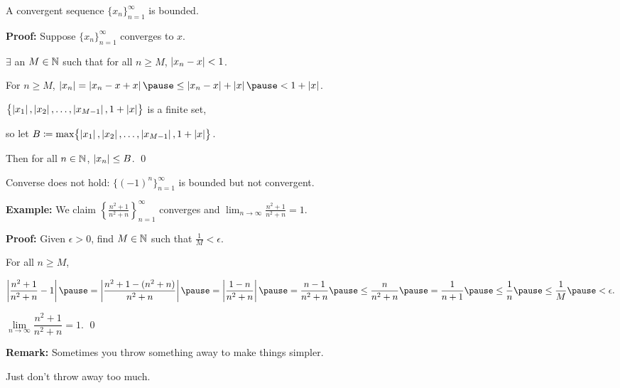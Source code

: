 \documentclass[10pt,aspectratio=169]{beamer}
\begin{document}
\begin{frame}

\begin{proposition}
A convergent sequence $\{ x_n \}_{n=1}^\infty$ is bounded.
\end{proposition}

\pause

\textbf{Proof:}
Suppose $\{ x_n \}_{n=1}^\infty$ converges to $x$.

\pause
\thus \quad $\exists$ an $M \in {\mathbb{N}}$ such that for all $n \geq M$,\quad
$\left\lvert {x_n - x} \right\rvert < 1$.

\medskip
\pause

For $n \geq M$, \quad
$\abs{x_n} = \abs{x_n - x + x} \pause
\leq \abs{x_n - x} + \abs{x} \pause
< 1 + \abs{x}$.

\medskip
\pause

$\bigl\{ \left\lvert {x_1} \right\rvert, \left\lvert {x_2} \right\rvert, \ldots, \left\lvert {x_{M-1}} \right\rvert, 1+\left\lvert {x} \right\rvert \bigr\}$
is a finite set,

so let
\quad $B \coloneqq \max \bigl\{ \left\lvert {x_1} \right\rvert, \left\lvert {x_2} \right\rvert, \ldots, \left\lvert {x_{M-1}} \right\rvert, 1+\left\lvert {x} \right\rvert \bigr\}$.

\medskip
\pause

Then for all $n \in {\mathbb{N}}$, \quad $\left\lvert {x_n} \right\rvert \leq B$.
\qed

\medskip
\pause

Converse does not hold: $\{ {(-1)}^n \}_{n=1}^\infty$ is bounded but not convergent.

\end{frame}

\begin{frame}


\textbf{Example:}
We claim $\left\{ \frac{n^2+1}{n^2+n} \right\}_{n=1}^\infty$ converges and
\quad $\displaystyle \lim_{n\to\infty} \frac{n^2+1}{n^2+n} = 1$.

\medskip
\pause

\textbf{Proof:}
Given $\epsilon > 0$, find $M \in {\mathbb{N}}$ such that $\frac{1}{M} < \epsilon$.

\medskip
\pause

For all $n \geq M$,

\medskip

\qquad
$\displaystyle
\abs{\frac{n^2+1}{n^2+n} - 1}  \pause = \abs{\frac{n^2+1 - (n^2+n)}{n^2+n}}
\pause
=
\abs{\frac{1 - n}{n^2+n}}
\pause
=
\frac{n-1}{n^2+n}
%
\pause
%
\leq 
\frac{n}{n^2+n} 
\pause
 =
\frac{1}{n+1}
\pause
\leq \frac{1}{n}
\pause
\leq \frac{1}{M}
\pause < \epsilon .
$\qquad

\medskip
\pause

\thus \quad
$\lim\limits_{n\to\infty} \dfrac{n^2+1}{n^2+n} = 1$. \qed

\medskip
\pause

\textbf{Remark:} Sometimes you throw something away
to make things simpler.

\pause
Just don't throw away too much.

\end{frame}
\end{document}
